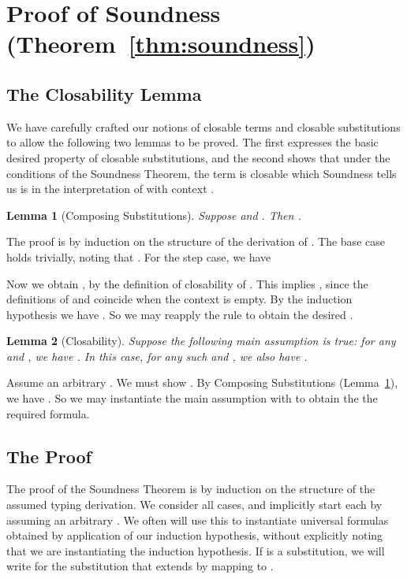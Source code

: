 \documentclass[copyright]{eptcs}
\newtheorem{lemma}{Lemma}
\begin{document}
\section{Proof of Soundness (Theorem~\ref{thm:soundness})}

\subsection{The Closability Lemma}

We have carefully crafted our notions of closable terms and closable
substitutions to allow the following two lemmas to be proved.  The
first expresses the basic desired property of closable substitutions,
and the second shows that under the conditions of the Soundness
Theorem, the term  is closable which Soundness tells us is
in the interpretation of  with context .

\begin{lemma}[Composing Substitutions]
\label{lem:csubst}
Suppose  and
.  Then
.
\end{lemma}

\noindent The proof is by induction on the
structure of the derivation of
.  The base case
holds trivially, noting that .  For
the step case, we have

\noindent Now we obtain
, by the
definition of closability of .  This implies
, since the
definitions of  and  coincide when
the context is empty.  By the induction hypothesis we have
.  So we may
reapply the rule to obtain the desired
.

\begin{lemma}[Closability]
\label{lem:close} Suppose the following main assumption is true: for any 
and , we have .  In this case, for any such
 and , we also have .
\end{lemma}

\noindent Assume an arbitrary .  We must
show .  By Composing
Substitutions (Lemma~\ref{lem:csubst}), we have
.  So we may instantiate the
main assumption with  to obtain the the required
formula.

\subsection{The Proof}

The proof of the Soundness Theorem is by induction on the structure of
the assumed typing derivation.  We consider all cases, and implicitly
start each by assuming an arbitrary .
We often will use this  to instantiate universal formulas
obtained by application of our induction hypothesis, without
explicitly noting that we are instantiating the induction hypothesis.
If  is a substitution, we will write  for the
substitution that extends  by mapping  to .
\end{document}
